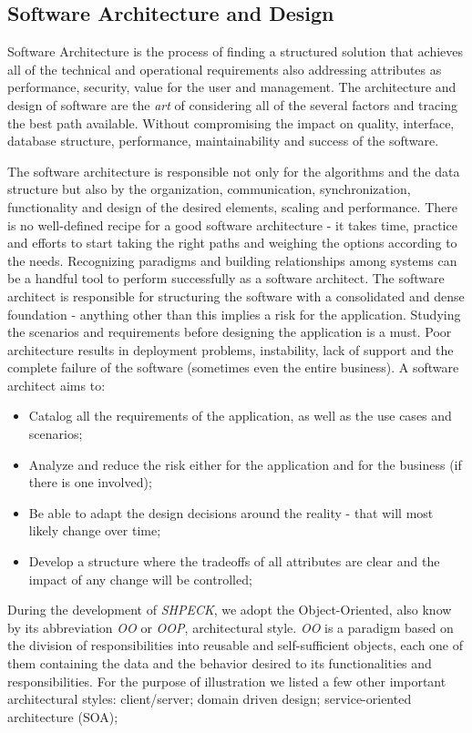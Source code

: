 \documentclass[ppgc,mestrado,english]{iiufrgs}
\begin{document}
\subsection{Software Architecture and Design}
Software Architecture is the process of finding a structured solution that achieves all of the technical and operational requirements also addressing attributes as performance, security, value for the user and management. The architecture and design of software are the \emph{art} of considering all of the several factors and tracing the best path available. Without compromising the impact on quality, interface, database structure, performance, maintainability and success of the software.

The software architecture is responsible not only for the algorithms and the data structure but also by the organization, communication, synchronization, functionality and design of the desired elements, scaling and performance. There is no well-defined recipe for a good software architecture - it takes time, practice and efforts to start taking the right paths and weighing the options according to the needs. Recognizing paradigms and building relationships among systems can be a handful tool to perform successfully as a software architect.
The software architect is responsible for structuring the software with a consolidated and dense foundation - anything other than this implies a risk for the application. Studying the scenarios and requirements before designing the application is a must. Poor architecture results in deployment problems, instability, lack of support and the complete failure of the software (sometimes even the entire business).
A software architect aims to: 
\begin{itemize}
\item Catalog all the requirements of the application, as well as the use cases and scenarios;
\item Analyze and reduce the risk either for the application and for the business (if there is one involved);
\item Be able to adapt the design decisions around the reality - that will most likely change over time;
\item Develop a structure where the tradeoffs of all attributes are clear and the impact of any change will be controlled;
\end{itemize}

During the development of \emph{SHPECK}, we adopt the Object-Oriented, also know by its abbreviation \emph{OO} or \emph{OOP}, architectural style. \emph{OO} is a paradigm based on the division of responsibilities into reusable and self-sufficient objects, each one of them containing the data and the behavior desired to its functionalities and responsibilities.
For the purpose of illustration we listed a few other important architectural styles: client/server; domain driven design; service-oriented architecture (SOA);
\end{document}
